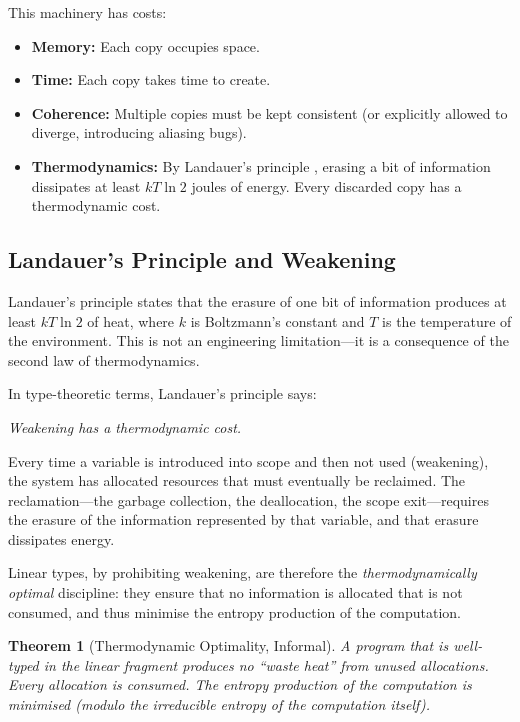\documentclass[11pt,a4paper]{article}
\newtheorem{theorem}{Theorem}[section]
\begin{document}
This machinery has costs:
\begin{itemize}
\item \textbf{Memory:} Each copy occupies space.
\item \textbf{Time:} Each copy takes time to create.
\item \textbf{Coherence:} Multiple copies must be kept consistent
  (or explicitly allowed to diverge, introducing aliasing bugs).
\item \textbf{Thermodynamics:} By Landauer's principle
  \citep{landauer1961irreversibility}, erasing a bit of information
  dissipates at least $kT \ln 2$ joules of energy. Every discarded
  copy has a thermodynamic cost.
\end{itemize}

\subsection{Landauer's Principle and Weakening}

Landauer's principle \citep{landauer1961irreversibility} states that
the erasure of one bit of information produces at least $kT \ln 2$
of heat, where $k$ is Boltzmann's constant and $T$ is the
temperature of the environment. This is not an engineering
limitation---it is a consequence of the second law of
thermodynamics.

In type-theoretic terms, Landauer's principle says:

\begin{center}
\emph{Weakening has a thermodynamic cost.}
\end{center}

Every time a variable is introduced into scope and then not used
(weakening), the system has allocated resources that must eventually
be reclaimed. The reclamation---the garbage collection, the
deallocation, the scope exit---requires the erasure of the
information represented by that variable, and that erasure dissipates
energy.

Linear types, by prohibiting weakening, are therefore the
\emph{thermodynamically optimal} discipline: they ensure that no
information is allocated that is not consumed, and thus minimise the
entropy production of the computation.

\begin{theorem}[Thermodynamic Optimality, Informal]
A program that is well-typed in the linear fragment produces no
``waste heat'' from unused allocations. Every allocation is consumed.
The entropy production of the computation is minimised (modulo the
irreducible entropy of the computation itself).
\end{theorem}
\end{document}
